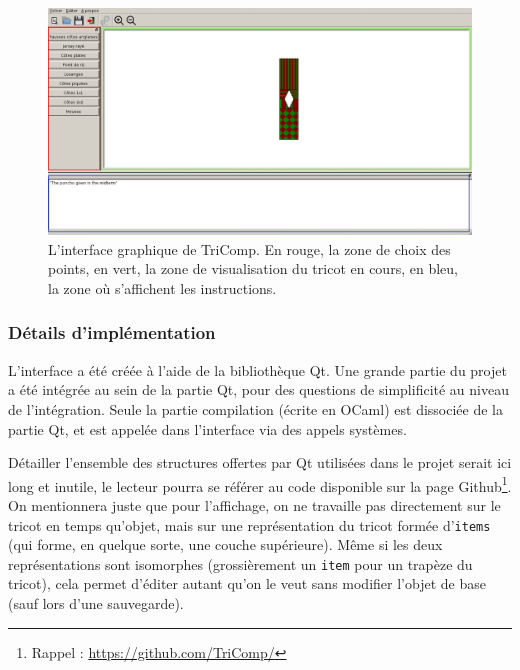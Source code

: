 \documentclass{article}
\begin{document}
\begin{figure}[!ht]
  \centering \includegraphics[scale=0.35]{../img/interface.jpg}
  \caption{L'interface graphique de TriComp. En \textcolor{rouge}{rouge}, 
    la zone de choix des points, en \textcolor{vert}{vert}, la zone de 
    visualisation du tricot en cours, en \textcolor{bleu}{bleu}, la 
    zone où s'affichent les instructions.}
  \label{interface}
\end{figure}


\pagebreak

\subsubsection{Détails d'implémentation}

L'interface a été créée à l'aide de la bibliothèque Qt. Une grande
partie du projet a été intégrée au sein de la partie Qt, pour des
questions de simplificité au niveau de l'intégration. Seule la partie
compilation (écrite en OCaml) est dissociée de la partie Qt, et est
appelée dans l'interface via des appels systèmes.

Détailler l'ensemble des structures offertes par Qt utilisées dans le projet
serait ici long et inutile, le lecteur pourra se référer au code
disponible sur la page Github\footnote{Rappel :
  \url{https://github.com/TriComp/}}. On mentionnera juste que pour
l'affichage, on ne travaille pas directement sur le tricot en temps
qu'objet, mais sur une représentation du tricot formée
d'\texttt{items} (qui forme, en quelque sorte, une couche
supérieure). Même si les deux représentations sont isomorphes
(grossièrement un \texttt{item} pour un trapèze du tricot), cela
permet d'éditer autant qu'on le veut sans modifier l'objet de base
(sauf lors d'une sauvegarde).
\end{document}
